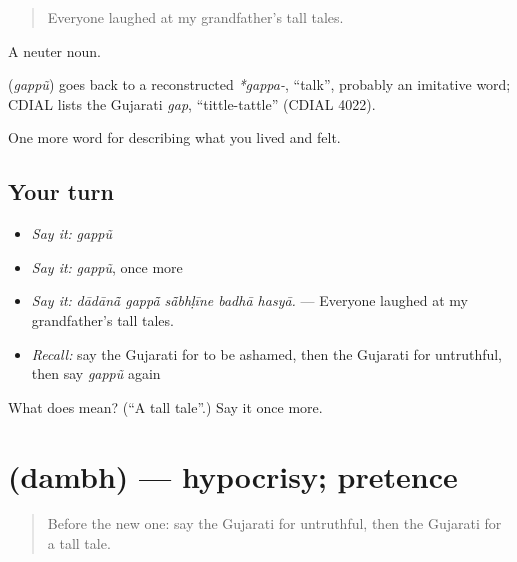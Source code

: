 \begin{quote}
Everyone laughed at my grandfather's tall tales.
\end{quote}

A neuter noun.

\begin{cousinweb}
\textbf{} (\emph{gappũ}) goes back to a reconstructed \emph{*gappa-}, \textquotedblleft{}talk\textquotedblright{}, probably an imitative word; CDIAL lists the Gujarati \emph{gap}, \textquotedblleft{}tittle-tattle\textquotedblright{} (CDIAL 4022).
\end{cousinweb}

\begin{grammarlens}[title={What you've built}]
One more word for describing what you lived and felt.
\end{grammarlens}

\subsection*{Your turn}
\begin{itemize}
\raggedright
  \item \emph{Say it:} \emph{gappũ}
  \item \emph{Say it:} \emph{gappũ}, once more
  \item \emph{Say it:} \emph{dādānā̃ gappā̃ sā̃bhḷīne badhā hasyā.} — Everyone laughed at my grandfather's tall tales.
  \item \emph{Recall:} say the Gujarati for to be ashamed, then the Gujarati for untruthful, then say \emph{gappũ} again
\end{itemize}

\begin{tcolorbox}[breakable,colback=teal!4,colframe=teal!35!black,title={Before you move on}]
What does  mean? (\textquotedblleft{}A tall tale\textquotedblright{}.) Say it once more.
\end{tcolorbox}
\section[\texorpdfstring{\gu{દંભ} (dambh)}{દંભ (dambh)}]{ (dambh) — hypocrisy; pretence}

\label{lesson:GU-C468-dambh}



\begin{quote}
Before the new one: say the Gujarati for untruthful, then the Gujarati for a tall tale.
\end{quote}

